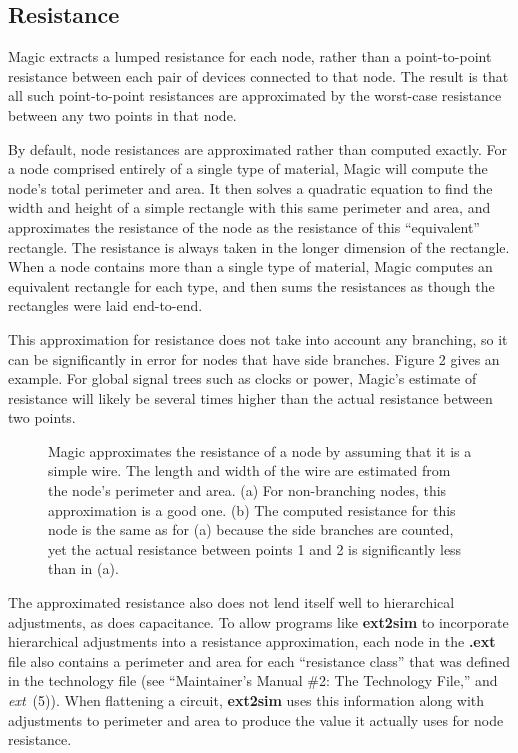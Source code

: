 \documentclass[letterpaper,twoside,12pt]{article}
\begin{document}
\subsection{Resistance}

Magic extracts a lumped resistance for each node, rather than a
point-to-point resistance between each pair of devices connected
to that node.  The result is that all such
point-to-point resistances are approximated by the
worst-case resistance between any two points in that node.

By default,
node resistances are approximated rather than computed exactly.
For a node comprised entirely of a single type of material,
Magic will compute the node's total perimeter and area.
It then solves a quadratic equation to find the width and height of a simple
rectangle with this same perimeter and area, and approximates the
resistance of the node as the resistance of this ``equivalent''
rectangle.  The resistance is always taken in
the longer dimension of the rectangle.
When a node contains more than a single type of material, Magic
computes an equivalent rectangle for each type, and then sums
the resistances as though the rectangles were laid end-to-end.

This approximation for resistance does not take into account any
branching, so it can be significantly in error for nodes that have
side branches.  Figure 2 gives an example.
For global signal trees such as clocks or power, Magic's estimate of
resistance will likely be several times higher than the actual
resistance between two points.

\begin{figure}[ht]
   \begin{center}
      \caption{Magic approximates the resistance of a node by
	assuming that it is a simple wire.  The length and width
	of the wire are estimated from the node's perimeter and area.
	(a) For non-branching nodes, this approximation is a good one.
	(b) The computed resistance for this node is the same as for
	(a) because the side branches are counted, yet the actual
	resistance between points 1 and 2 is significantly less
	than in (a).}
   \end{center}
\end{figure}

The approximated resistance also does not lend itself well to
hierarchical adjustments, as does capacitance.  To allow programs
like {\bfseries ext2sim} to incorporate hierarchical adjustments into
a resistance approximation, each node in the {\bfseries .ext} file
also contains a perimeter and area for each ``resistance class''
that was defined in the technology file (see ``Maintainer's
Manual \#2: The Technology File,'' and {\itshape ext}~(5)).
When flattening a circuit, {\bfseries ext2sim} uses this information
along with adjustments to perimeter and area
to produce the value it actually uses for node resistance.
\end{document}
